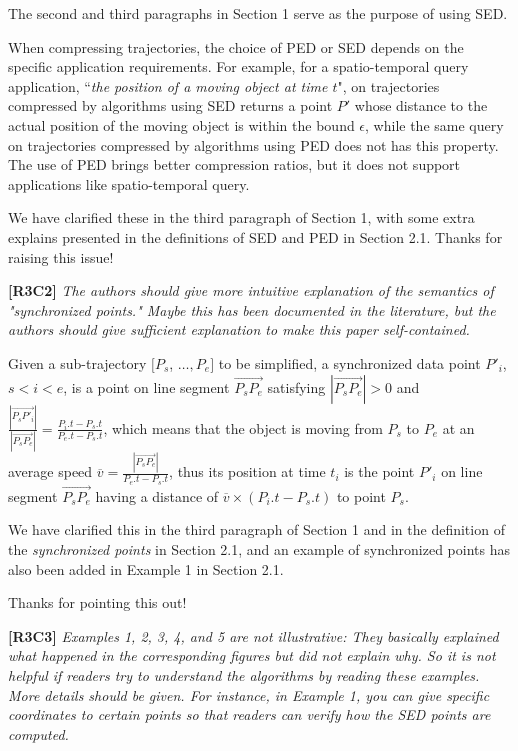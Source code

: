 \documentclass{letter}
\newcommand{\vv}{\overrightarrow}
\begin{document}
The second and third paragraphs in Section 1 serve as the purpose of using SED.

When compressing trajectories, the choice of PED or SED depends on the specific application requirements. For example, for a spatio-temporal query application, ``\emph{the position of a moving object at time $t$}", on trajectories compressed by algorithms using SED returns a point $P'$ whose distance to the actual position of the moving object is within the bound $\epsilon$, while the same query on trajectories compressed by algorithms using PED does not has this property. The use of PED brings better compression ratios, but it does not support applications like spatio-temporal query.

We have clarified these in the third paragraph of Section 1, with some extra explains presented in the definitions of SED and PED in Section 2.1. Thanks for raising this issue!

\textbf{[R3C2]} \emph{The authors should give more intuitive explanation of the semantics of "synchronized points." Maybe this has been documented in the literature, but the authors should give sufficient explanation to make this paper self-contained.}

Given a sub-trajectory $[P_s$, $\ldots, P_e]$ to be simplified, a synchronized data point $P'_i$, $s<i<e$, is a point on line segment $\overrightarrow{P_sP_{e}}$ satisfying $|\vv{P_sP_e}|>0$ and $\frac{|\vv{P_sP'_i}|}{|\vv{P_sP_e}|} = \frac{P_i.t - P_s.t}{P_e.t-P_s.t}$, which means that the object is moving from $P_s$ to $P_e$ at an average speed $\overline{v} = \frac{|\vv{P_sP_e}|}{P_e.t-P_s.t}$, thus its position at time $t_i$ is the point $P'_i$ on line segment $\overrightarrow{P_sP_{e}}$ having a distance of $\overline{v}\times (P_i.t-P_s.t)$ to point $P_s$.

We have clarified this in the third paragraph of Section 1 and in the definition of the \emph{synchronized points} in Section 2.1, and an example of synchronized points has also been added in Example 1 in Section 2.1.

Thanks for pointing this out!



\textbf{[R3C3]} \emph{Examples 1, 2, 3, 4, and 5 are not illustrative: They basically explained what happened in the corresponding figures but did not explain why. So it is not helpful if readers try to understand the algorithms by reading these examples. More details should be given. For instance, in Example 1, you can give specific coordinates to certain points so that readers can verify how the SED points are computed.}
\end{document}
